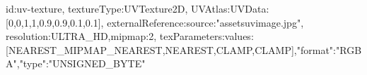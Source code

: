{id:uv-texture,
textureType:UVTexture2D,
UVAtlas:{UVData:[0,0,1,1,0.9,0.9,0.1,0.1]},
externalReference:{source:"assets\/uvimage.jpg"},
resolution:ULTRA_HD,mipmap:2,
texParameters:{values:[NEAREST_MIPMAP_NEAREST,NEAREST,CLAMP,CLAMP]},"format":"RGBA","type":"UNSIGNED_BYTE"}